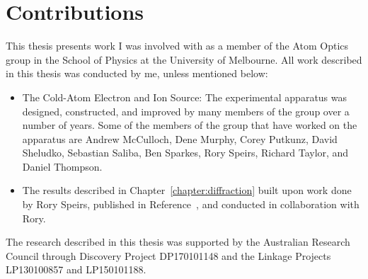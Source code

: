 \chapter*{Contributions}

This thesis presents work I was involved with as a member of the Atom Optics group in the School of Physics at the University of Melbourne.
All work described in this thesis was conducted by me, unless mentioned below:
\begin{itemize}
\item The Cold-Atom Electron and Ion Source: The experimental apparatus was designed, constructed, and improved by many members of the group over a number of years.
Some of the members of the group that have worked on the apparatus are
Andrew McCulloch, Dene Murphy, Corey Putkunz, David Sheludko, Sebastian Saliba, Ben Sparkes, Rory Speirs, Richard Taylor, and Daniel Thompson.
\item The results described in Chapter~\ref{chapter:diffraction} built upon work done by Rory Speirs, published in Reference~\cite{speirs_single-shot_2015}, and conducted in collaboration with Rory.
\end{itemize}

\vspace{4cm}

\noindent
The research described in this thesis was supported by the Australian Research Council through Discovery Project DP170101148 and the Linkage Projects LP130100857 and LP150101188.
